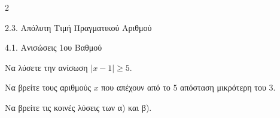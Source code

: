 \begin{ylh}{2}
    \item 2.3. Απόλυτη Τιμή Πραγματικού Αριθμού
    \item 4.1. Ανισώσεις 1ου Βαθμού
\end{ylh}

\begin{alist}
\item Να λύσετε την ανίσωση $|x - 1| \ge 5$.
\item Να βρείτε τους αριθμούς $x$ που απέχουν από το $5$ απόσταση μικρότερη του $3$.
\item Να βρείτε τις κοινές λύσεις των α) και β).
\end{alist}

